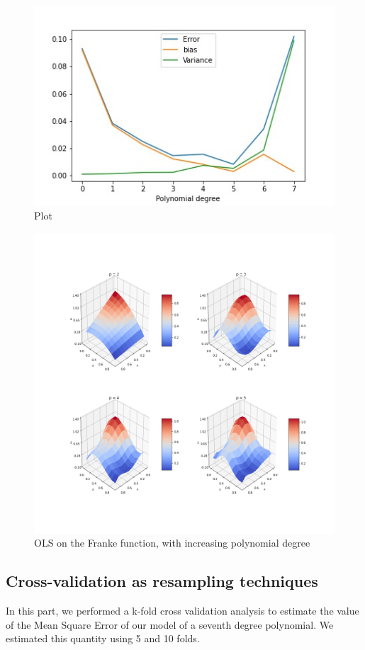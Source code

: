 \documentclass{article}
\begin{document}
\begin{figure}
\includegraphics[scale=0.5]{partBplot.jpg}
\centering
\caption{Plot}
\label{fig:plot}
\end{figure}

\begin{figure}
\includegraphics[scale=0.35]{frankePlots.png}
\caption{OLS on the Franke function, with increasing polynomial degree}
\end{figure}

\subsection{Cross-validation as resampling techniques}
In this part, we performed a k-fold cross validation analysis to estimate the value of the Mean Square Error of our model of a seventh degree polynomial. We estimated this quantity using 5 and 10 folds.
\end{document}
